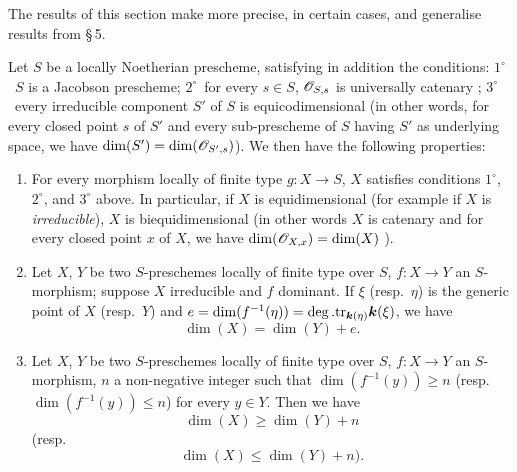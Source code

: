 The results of this section make more precise, in certain cases, and generalise results from \S\,5.

\begin{proposition}[10.6.1]
\label{IV.10.6.1}
Let $S$ be a locally Noetherian prescheme, satisfying in addition the conditions: $1^\circ$~$S$ is a Jacobson prescheme; $2^\circ$~for every $s\in S$, $\mathscr{O}_{S,s}$ is universally catenary ; $3^\circ$~every irreducible component $S'$ of $S$ is equicodimensional \textup{(in other words, for every closed point $s$ of $S'$ and every sub-prescheme of $S$ having $S'$ as underlying space, we have $\dim(S')=\dim(\mathscr{O}_{S',s})$)}.
We then have the following properties:
\begin{enumerate}[label=\textup{(\roman*)}]
  \item For every morphism locally of finite type $g:X\to S$, $X$ satisfies conditions $1^\circ$, $2^\circ$, and $3^\circ$ above.
In particular, if $X$ is equidimensional \textup{(for example if $X$ is \emph{irreducible})}, $X$ is biequidimensional \textup{(in other words $X$ is catenary and for every closed point $x$ of $X$, we have $\dim(\mathscr{O}_{X,x})=\dim(X)$ )}.
  \item Let $X$, $Y$ be two $S$-preschemes locally of finite type over $S$, $f:X\to Y$ an $S$-morphism; suppose $X$ irreducible and $f$ dominant.
If $\xi$ \textup{(resp.\ $\eta$)} is the generic point of $X$ \textup{(resp.\ $Y$)} and $e=\dim(f^{-1}(\eta))=\deg.\mathrm{tr}_{\boldsymbol{k}(\eta)}\boldsymbol{k}(\xi)$, we have
\begin{equation}
\label{IV.10.6.1.1}
\tag{10.6.1.1}
\dim(X)=\dim(Y)+e.
\end{equation}
  \item Let $X$, $Y$ be two $S$-preschemes locally of finite type over $S$, $f:X\to Y$ an $S$-morphism, $n$ a non-negative integer such that $\dim(f^{-1}(y))\geq n$ \textup{(resp.\ $\dim(f^{-1}(y))\leq n$)} for every $y\in Y$.
Then we have
\begin{equation}
\label{IV.10.6.1.2}
\tag{10.6.1.2}
\dim(X)\geq\dim(Y)+n
\end{equation}
\textup{(resp.}
\begin{equation}
\label{IV.10.6.1.3}
\tag{10.6.1.3}
\dim(X)\leq\dim(Y)+n).
\end{equation}
\end{enumerate}
\end{proposition}

